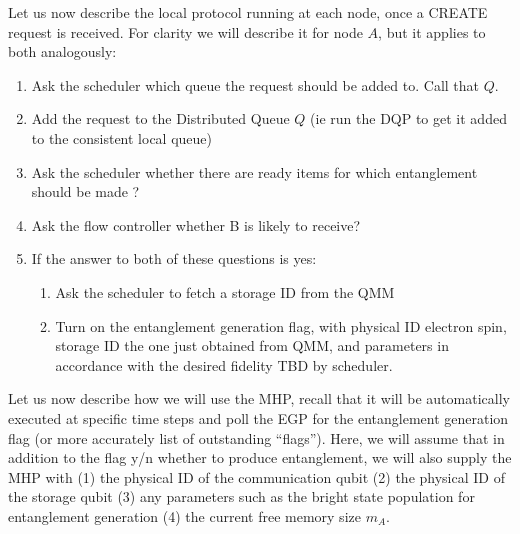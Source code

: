 \documentclass{article}
\begin{document}
Let us now describe the local protocol running at each node, once a CREATE request is received. For clarity we will describe it for node $A$, but
it applies to both analogously:
\begin{enumerate}
\item Ask the scheduler which queue the request should be added to. Call that $Q$.
\item Add the request to the Distributed Queue $Q$ (ie run the DQP to get it added to the consistent local queue)
\item Ask the scheduler whether there are ready items for which entanglement should be made ?
\item Ask the flow controller whether B is likely to receive?
\item If the answer to both of these questions is yes:
\begin{enumerate}
\item Ask the scheduler to fetch a storage ID from the QMM
\item Turn on the entanglement generation flag, with physical ID electron spin, storage ID the one just obtained from QMM, and parameters
in accordance with the desired fidelity TBD by scheduler. 
\end{enumerate}
\end{enumerate}

Let us now describe how we will use the MHP, recall that it will be automatically executed at specific time steps and poll the EGP for the entanglement generation flag (or more accurately list of outstanding ``flags''). Here, we will assume that in addition to the flag y/n whether to produce entanglement, we will also supply the MHP with (1) the physical ID of the communication qubit (2) the physical ID of the storage qubit (3) any parameters such as the bright state population for entanglement generation (4) the current free memory size $m_A$. 
\end{document}
